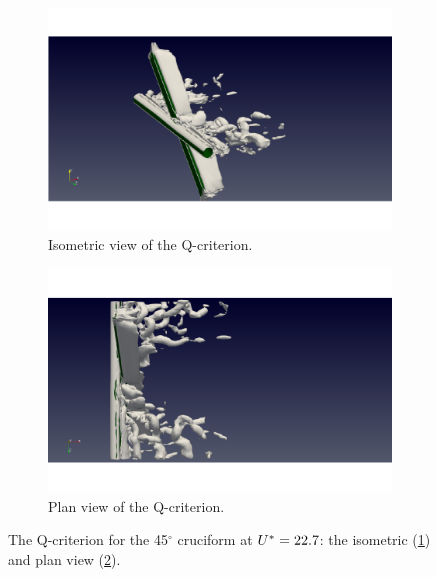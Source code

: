 \documentclass[oneside]{utmthesis}
\begin{document}
\begin{figure}
  \centering
  \begin{subfigure}[h]{0.9\textwidth}
    \includegraphics[width=\textwidth]{figs/qIso045U10}
    \caption{Isometric view of the Q-criterion.}
    \label{fig:qIso045U10}
  \end{subfigure}

  \begin{subfigure}[h]{0.9\textwidth}
    \includegraphics[width=\textwidth]{figs/qTop045U10}
    \caption{Plan view of the Q-criterion.}
    \label{fig:qTop045U10}
  \end{subfigure}

  \caption{The Q-criterion for the 45$^{\circ}$ cruciform at $U^{*} = 22.7$: the isometric (\ref{fig:qIso045U10}) and plan view (\ref{fig:qTop045U10}).} \label{fig:qCrit045U10}
\end{figure}
\end{document}
